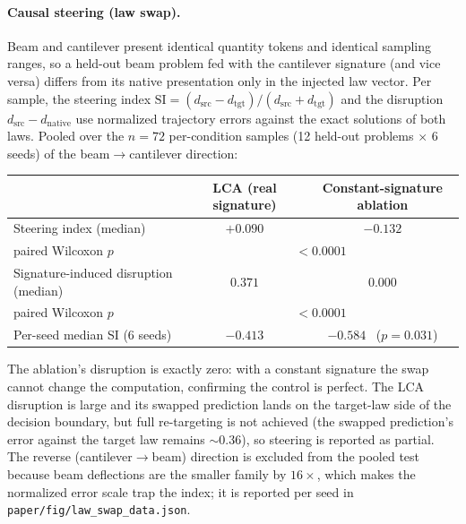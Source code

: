 \documentclass[11pt,a4paper]{article}
\begin{document}
\paragraph{Causal steering (law swap).} Beam and cantilever present identical
quantity tokens and identical sampling ranges, so a held-out beam problem
fed with the cantilever signature (and vice versa) differs from its native
presentation only in the injected law vector. Per sample, the steering
index $\mathrm{SI}=(d_{\mathrm{src}}-d_{\mathrm{tgt}})/(d_{\mathrm{src}}+d_{\mathrm{tgt}})$
and the disruption $d_{\mathrm{src}}-d_{\mathrm{native}}$ use normalized
trajectory errors against the exact solutions of both laws. Pooled over
the $n{=}72$ per-condition samples (12 held-out problems $\times$ 6 seeds)
of the beam$\to$cantilever direction:
\begin{center}\small\begin{tabular}{@{}lcc@{}}
\toprule
 & LCA (real signature) & Constant-signature ablation \\
\midrule
Steering index (median) & $+0.090$ & $-0.132$ \\
  paired Wilcoxon $p$ & \multicolumn{2}{c}{$<0.0001$} \\
Signature-induced disruption (median) & $0.371$ & $0.000$ \\
  paired Wilcoxon $p$ & \multicolumn{2}{c}{$<0.0001$} \\
Per-seed median SI (6 seeds) & $-0.413$ & $-0.584$ \ ($p=0.031$) \\
\bottomrule
\end{tabular}\end{center}
The ablation's disruption is exactly zero: with a constant signature the
swap cannot change the computation, confirming the control is perfect. The
LCA disruption is large and its swapped prediction lands on the target-law
side of the decision boundary, but full re-targeting is not achieved (the
swapped prediction's error against the target law remains $\sim$0.36), so
steering is reported as partial. The reverse (cantilever$\to$beam)
direction is excluded from the pooled test because beam deflections are the
smaller family by $16\times$, which makes the normalized error scale trap
the index; it is reported per seed in
\texttt{paper/fig/law\_swap\_data.json}.
\end{document}
